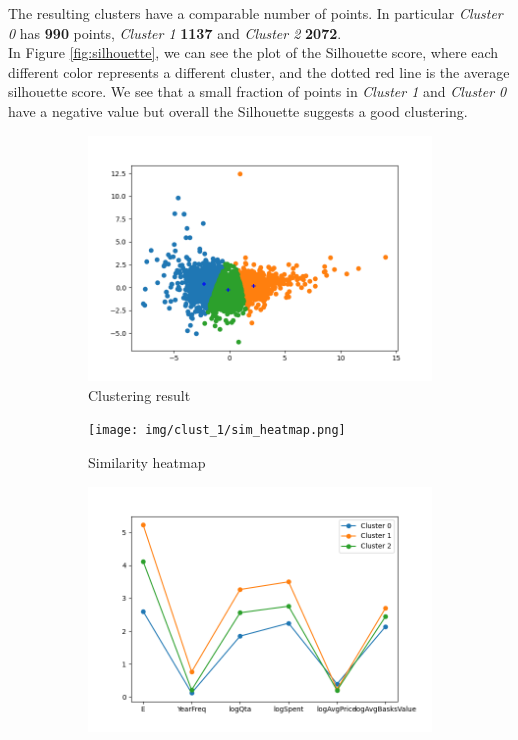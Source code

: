 The resulting clusters have a comparable number of points. In particular \emph{Cluster 0} has \textbf{990} points, \emph{Cluster 1} \textbf{1137} and \emph{Cluster 2} \textbf{2072}.\\
In Figure \ref{fig:silhouette}, we can see the plot of the Silhouette score, where each different color represents a different cluster, and the dotted red line is the average silhouette score. 
We see that a small fraction of points in \emph{Cluster 1} and \emph{Cluster 0} have a negative value but overall the Silhouette suggests a good clustering.

\begin{figure}[h!]
    \centering
    \captionsetup{justification=centering}
    \begin{subfigure}{0.32\textwidth}
        \includegraphics[width=\textwidth]{img/clust_1/km_clusters.png}
        \caption{Clustering result}
        \label{fig:skmclust}
    \end{subfigure}
    \begin{subfigure}{0.32\textwidth}
        \texttt{[image: img/clust\_1/sim\_heatmap.png]}
        \caption{Similarity heatmap}
        \label{fig:sim_heatmap}
    \end{subfigure}
    \begin{subfigure}{0.32\textwidth}
        \includegraphics[width=\textwidth]{img/clust_1/cluster_avg.png}

\end{subfigure}
\end{figure}
